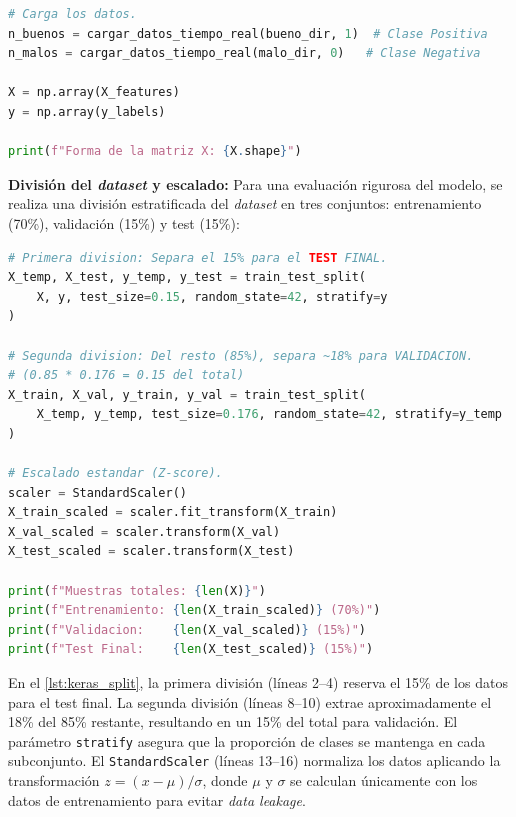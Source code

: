 \begin{lstlisting}[language=Python, caption={Ejecución de la carga de datos.}, label={lst:keras_carga_exec}]
# Carga los datos.
n_buenos = cargar_datos_tiempo_real(bueno_dir, 1)  # Clase Positiva
n_malos = cargar_datos_tiempo_real(malo_dir, 0)   # Clase Negativa

X = np.array(X_features)
y = np.array(y_labels)

print(f"Forma de la matriz X: {X.shape}")
\end{lstlisting}

\textbf{División del \textit{dataset} y escalado:} Para una evaluación rigurosa del modelo, se realiza una división estratificada del \textit{dataset} en tres conjuntos: entrenamiento (70\%), validación (15\%) y test (15\%):

\begin{lstlisting}[language=Python, caption={División estratificada y escalado de los datos.}, label={lst:keras_split}]
# Primera division: Separa el 15% para el TEST FINAL.
X_temp, X_test, y_temp, y_test = train_test_split(
    X, y, test_size=0.15, random_state=42, stratify=y
)

# Segunda division: Del resto (85%), separa ~18% para VALIDACION.
# (0.85 * 0.176 = 0.15 del total)
X_train, X_val, y_train, y_val = train_test_split(
    X_temp, y_temp, test_size=0.176, random_state=42, stratify=y_temp
)

# Escalado estandar (Z-score).
scaler = StandardScaler()
X_train_scaled = scaler.fit_transform(X_train)
X_val_scaled = scaler.transform(X_val)
X_test_scaled = scaler.transform(X_test)

print(f"Muestras totales: {len(X)}")
print(f"Entrenamiento: {len(X_train_scaled)} (70%)")
print(f"Validacion:    {len(X_val_scaled)} (15%)")
print(f"Test Final:    {len(X_test_scaled)} (15%)")
\end{lstlisting}

En el \autoref{lst:keras_split}, la primera división (líneas 2--4) reserva el 15\% de los datos para el test final. La segunda división (líneas 8--10) extrae aproximadamente el 18\% del 85\% restante, resultando en un 15\% del total para validación. El parámetro \texttt{stratify} asegura que la proporción de clases se mantenga en cada subconjunto. El \texttt{StandardScaler} (líneas 13--16) normaliza los datos aplicando la transformación $z = (x - \mu) / \sigma$, donde $\mu$ y $\sigma$ se calculan únicamente con los datos de entrenamiento para evitar \textit{data leakage}.

